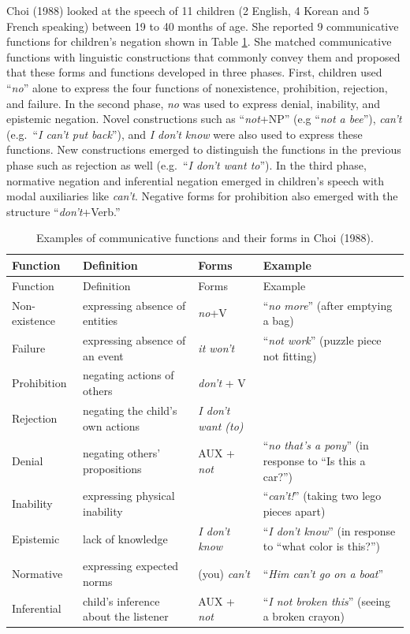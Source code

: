 \documentclass[
  english,
  man,floatsintext]{apa6}
\begin{document}
Choi (1988) looked at the speech of 11 children (2 English, 4 Korean and 5 French speaking) between 19 to 40 months of age. She reported 9 communicative functions for children's negation shown in Table \ref{tab:choi}. She matched communicative functions with linguistic constructions that commonly convey them and proposed that these forms and functions developed in three phases. First, children used ``\emph{no}'' alone to express the four functions of nonexistence, prohibition, rejection, and failure. In the second phase, \emph{no} was used to express denial, inability, and epistemic negation. Novel constructions such as ``\emph{not}+NP'' (e.g ``\emph{not a bee}''), \emph{can't} (e.g.~``\emph{I can't put back}''), and \emph{I don't know} were also used to express these functions. New constructions emerged to distinguish the functions in the previous phase such as rejection as well (e.g.~``\emph{I don't want to}''). In the third phase, normative negation and inferential negation emerged in children's speech with modal auxiliaries like \emph{can't}. Negative forms for prohibition also emerged with the structure ``\emph{don't}+Verb.''

\begin{longtable}[]{@{}
  >{\raggedright\arraybackslash}p{}
  >{\raggedright\arraybackslash}p{}
  >{\raggedright\arraybackslash}p{}
  >{\raggedright\arraybackslash}p{}@{}}
\caption{\label{tab:choi} Examples of communicative functions and their forms in Choi (1988).}\tabularnewline
\toprule
Function & Definition & Forms & Example \\
\midrule
\endfirsthead
\toprule
Function & Definition & Forms & Example \\
\midrule
\endhead
Non-existence & expressing absence of entities & \emph{no}+V & ``\emph{no more}'' (after emptying a bag) \\
Failure & expressing absence of an event & \emph{it won't} & ``\emph{not work}'' (puzzle piece not fitting) \\
Prohibition & negating actions of others & \emph{don't} + V & \\
Rejection & negating the child's own actions & \emph{I don't want (to)} & \\
Denial & negating others' propositions & AUX + \emph{not} & ``\emph{no that's a pony}'' (in response to ``Is this a car?'') \\
Inability & expressing physical inability & & ``\emph{can't!}'' (taking two lego pieces apart) \\
Epistemic & lack of knowledge & \emph{I don't know} & ``\emph{I don't know}'' (in response to ``what color is this?'') \\
Normative & expressing expected norms & (you) \emph{can't} & ``\emph{Him can't go on a boat}'' \\
Inferential & child's inference about the listener & AUX + \emph{not} & ``\emph{I not broken this}'' (seeing a broken crayon) \\
\bottomrule
\end{longtable}
\end{document}
